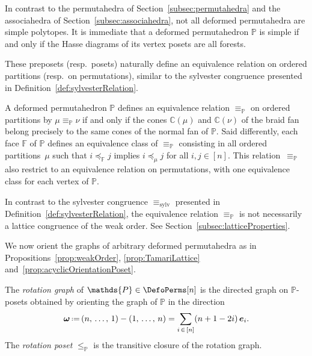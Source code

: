 \documentclass[AHL,Unicode,longabstracts,published]{cedram}
\renewcommand{\b}[1]{\boldsymbol{#1}}
\newcommand{\eqdef}{\mbox{\,\raisebox{0.2ex}{\scriptsize\ensuremath{\mathrm:}}\ensuremath{=}\,}}
\newcommand{\polytope}[1]{\mathds{#1}}
\newcommand{\sylv}{\mathrm{sylv}}
\begin{document}
\begin{rema}\label{rem:simpleDeformedPermutahedra}
In contrast to the permutahedra of Section~\ref{subsec:permutahedra} and the associahedra of Section~\ref{subsec:associahedra}, not all deformed permutahedra are simple polytopes. It is immediate that a deformed permutahedron $\polytope{P}$ is simple if and only if the Hasse diagrams of its vertex posets are all forests.
\end{rema}

These preposets (resp.~posets) naturally define an equivalence relation on ordered partitions (resp.~on permutations), similar to the sylvester congruence presented in Definition~\ref{def:sylvesterRelation}.

\begin{defi}\label{def:equivalenceRelationDeformedPermutahedron}
A deformed permutahedron $\polytope{P}$ defines an equivalence relation $\equiv_{\polytope{P}}$ on ordered partitions by $\mu \equiv_{\polytope{P}} \nu$ if and only if the cones $\polytope{C}(\mu)$ and $\polytope{C}(\nu)$ of the braid fan belong precisely to the same cones of the normal fan of $\polytope{P}$. Said differently, each face $\polytope{F}$ of $\polytope{P}$ defines an equivalence class of $\equiv_\polytope{P}$ consisting in all ordered partitions~$\mu$ such that $i \preccurlyeq_\polytope{F} j$ implies $i \preccurlyeq_\mu j$ for all $i,j \in [n]$. This relation~$\equiv_\polytope{P}$ also restrict to an equivalence relation on permutations, with one equivalence class for each vertex of $\polytope{P}$.
\end{defi}

\begin{rema}\label{rem:equivalenceNotCongruence}
In contrast to the sylvester congruence $\equiv_\sylv$ presented in Definition~\ref{def:sylvesterRelation}, the equivalence relation $\equiv_{\polytope{P}}$ is not necessarily a lattice congruence of the weak order. See Section~\ref{subsec:latticeProperties}.
\end{rema}

We now orient the graphs of arbitrary deformed permutahedra as in Propositions~\ref{prop:weakOrder}, \ref{prop:TamariLattice} and~\ref{prop:acyclicOrientationPoset}.

\begin{defi}\label{def:rotationPoset}
The
\emph{rotation graph} of $\polytope{P} \in \DefoPerms[n]$ is the directed graph on $\polytope{P}$-posets obtained by orienting the graph of $\polytope{P}$ in the direction
\[
{\b{\omega} \eqdef (n,\,\dots,\,1) - (1,\,\dots,\,n) = \sum_{i\,\in\,[n]} (n+1-2i) \, \b{e}_i}.
\]
The
\emph{rotation poset} $\le_\polytope{P}$ is the transitive closure of the rotation graph.
\end{defi}
\end{document}
